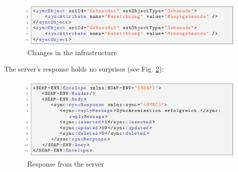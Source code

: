 \documentclass[a4paper,10pt]{book}
\begin{document}
\newline
\begin{figure}[htb!]
  \centering
  \includegraphics[scale=.75]{Screenshot/SyncAPI_Fallstudie_11-en.png}
  \caption{\label{Changes in the infrastructure} \ Changes in the infrastructure}
\end{figure}
\newline
The server's response holds no surprises (see Fig. \ref{Response from the server}):
\newline
\begin{figure}[htb!]
  \centering
  \includegraphics[scale=.7]{Screenshot/SyncAPI_Fallstudie_12-en.png}
  \caption{\label{Response from the server} \ Response from the server}
\end{figure}
\newline
\end{document}
